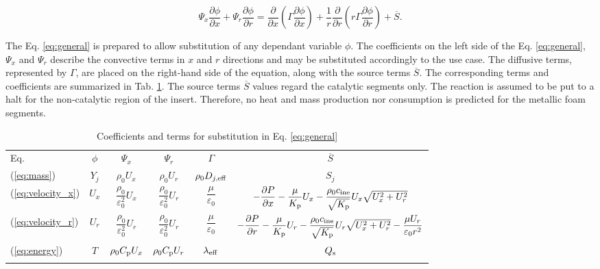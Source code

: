 \documentclass[preprint,12pt]{elsarticle}
\begin{document}
\begin{equation}
\label{eq:general}
\varPsi_x \dfrac{\partial \phi}{\partial x} + \varPsi_r \dfrac{\partial \phi}{\partial r} = \dfrac{\partial}{\partial x} \left( \varGamma \dfrac{\partial \phi}{\partial x} \right) + \dfrac{1}{r} \dfrac{\partial}{\partial r} \left( r \varGamma \dfrac{\partial \phi}{\partial r} \right) + \overline{S}.
\end{equation}
\hspace{\fill}

The Eq. \eqref{eq:general} is prepared to allow substitution of any dependant variable $\phi$. The coefficients on the left side of the Eq. \eqref{eq:general}, $\varPsi_x$ and $\varPsi_r$ describe the convective terms in $x$ and $r$ directions and may be substituted accordingly to the use case. The diffusive terms, represented by $\varGamma$, are placed on the right-hand side of the equation, along with the source terms $\overline{S}$.  The corresponding terms and coefficients are summarized in Tab. \ref{tab:coeff}. The source terms $\overline{S}$ values regard the catalytic segments only. The reaction is assumed to be put to a halt for the non-catalytic region of the insert. Therefore, no heat and mass production nor consumption is predicted for the metallic foam segments.
 
\begin{table}
\caption{Coefficients and terms for substitution in Eq. \eqref{eq:general}}
\label{tab:coeff}
\begin{tabular}{l|c|c|c|c|c}
\hline\noalign{\smallskip}
Eq. & $\phi$ & $\varPsi_x$ & $\varPsi_r$ & $\varGamma$ & $\overline{S}$  \\
\noalign{\smallskip}\hline\noalign{\smallskip}
(\ref{eq:mass}) & $Y_j$ & $\rho_0 U_x$ & $\rho_0 U_r$ & $\rho_0 D_{j,\rm{eff}}$ & $S_j$ \\
(\ref{eq:velocity_x}) & $U_x$ & $\dfrac{\rho_0}{\varepsilon^2_0} U_x$ & $\dfrac{\rho_0}{\varepsilon^2_0} U_r$ & $\dfrac{\mu}{\varepsilon_0}$ & $-\dfrac{\partial P}{\partial x} - \dfrac{\mu}{K_{\rm{p}}} U_x - \dfrac{\rho_0 c_{\rm{ine}}}{\sqrt{K_{\rm{p}}}} U_x \sqrt{U^2_x+U^2_r}$ \\
(\ref{eq:velocity_r}) & $U_r$ & $\dfrac{\rho_0}{\varepsilon^2_0} U_r$ & $\dfrac{\rho_0}{\varepsilon^2_0} U_r$ & $\dfrac{\mu}{\varepsilon_0}$ & $-\dfrac{\partial P}{\partial r} - \dfrac{\mu}{K_{\rm{p}}} U_r - \dfrac{\rho_0 c_{\rm{ine}}}{\sqrt{K_{\rm{p}}}} U_r \sqrt{U^2_x+U^2_r} - \dfrac{\mu U_r}{\varepsilon_0 r^2}$ \\
(\ref{eq:energy}) & $T$ & $\rho_0 C_{\rm{p}} U_x$ & $\rho_0 C_{\rm{p}} U_r$ & $\lambda_{\rm{eff}}$ & $Q_{\rm{s}}$ \\

\noalign{\smallskip}\hline
\end{tabular}
\end{table}
\end{document}
